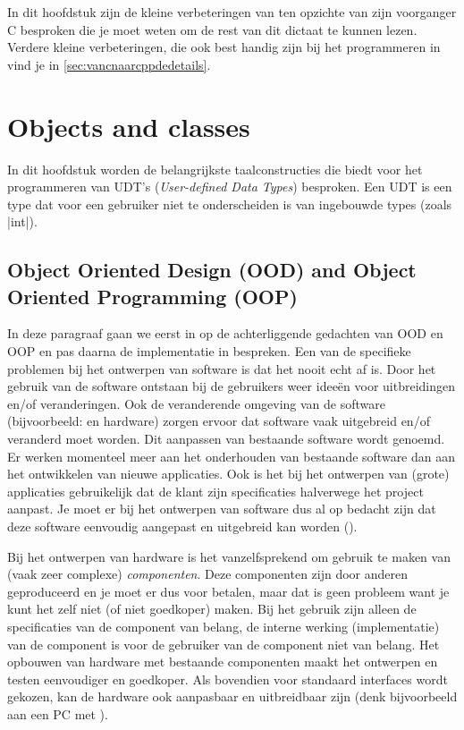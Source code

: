 \begin{cpplstShortInline}
In dit hoofdstuk zijn de kleine verbeteringen van \Cpp{} ten opzichte van zijn voorganger C besproken die je moet weten om de rest van dit dictaat te kunnen lezen.
Verdere kleine verbeteringen, die ook best handig zijn bij het programmeren in \Cpp{} vind je in \cref{sec:vancnaarcppdedetails}.

\chapter{Objects and classes}
\label{sec:objectandclasses}
In dit hoofdstuk worden de belangrijkste taalconstructies die \Cpp{} biedt voor het programmeren van UDT's (\emph{User-defined Data Types}) besproken.
Een UDT is een \emph{} type dat voor een gebruiker niet te onderscheiden is van ingebouwde types (zoals |int|).

\section{Object Oriented Design (OOD) and Object Oriented Programming (OOP)}
\label{inleidingOODOOP}
In deze paragraaf gaan we eerst in op de achterliggende gedachten van OOD en OOP en pas daarna de implementatie in \Cpp{} bespreken.
Een van de specifieke problemen bij het ontwerpen van software is dat het nooit echt af is.
Door het gebruik van de software ontstaan bij de gebruikers weer ideeën voor uitbreidingen en/of veranderingen.
Ook de veranderende omgeving van de software (bijvoorbeeld:  en hardware) zorgen ervoor dat software vaak uitgebreid en/of veranderd moet worden.
Dit aanpassen van bestaande software wordt \emph{} genoemd.
Er werken momenteel meer  aan het onderhouden van bestaande software dan aan het ontwikkelen van nieuwe applicaties.
Ook is het bij het ontwerpen van (grote) applicaties gebruikelijk dat de klant zijn specificaties halverwege het project aanpast.
Je moet er bij het ontwerpen van software dus al op bedacht zijn dat deze software eenvoudig aangepast en uitgebreid kan worden ().

Bij het ontwerpen van hardware is het vanzelfsprekend om gebruik te maken van (vaak zeer complexe) \emph{componenten}.
Deze componenten zijn door anderen geproduceerd en je moet er dus voor betalen, maar dat is geen probleem want je kunt het zelf niet (of niet goedkoper) maken.
Bij het gebruik zijn alleen de specificaties van de component van belang, de interne werking (implementatie) van de component is voor de gebruiker van de component niet van belang.
Het opbouwen van hardware met bestaande componenten maakt het ontwerpen en testen eenvoudiger en goedkoper.
Als bovendien voor standaard interfaces wordt gekozen, kan de hardware ook aanpasbaar en uitbreidbaar zijn (denk bijvoorbeeld aan een PC met ).


\end{cpplstShortInline}
